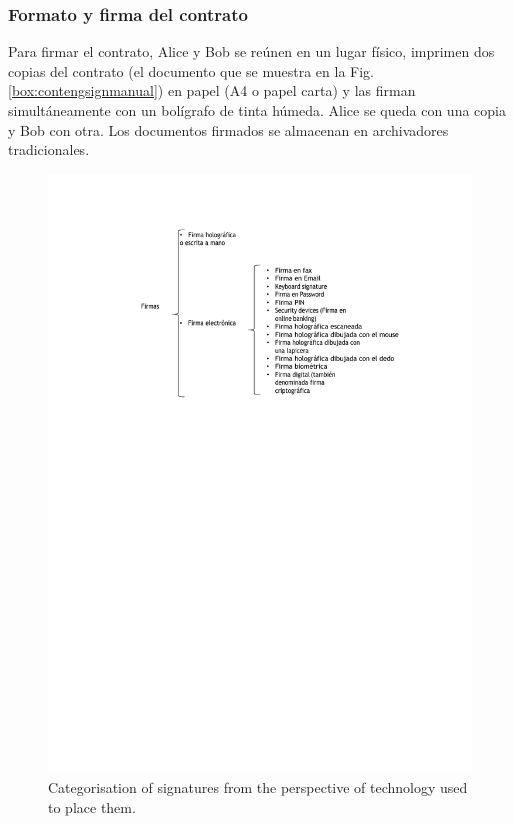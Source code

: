 \documentclass[12pt]{report} %
\begin{document}
\subsubsection{Formato y firma del contrato }

Para firmar el contrato, Alice y Bob se reúnen en un lugar físico, imprimen dos copias del contrato (el documento que se muestra en la Fig. \ref{box:contengsignmanual}) en papel (A4 o papel carta) y las firman simultáneamente con un bolígrafo de tinta húmeda. Alice se queda con una copia y Bob con otra. Los documentos firmados se almacenan en archivadores tradicionales.

\begin{figure}
\centering
\includegraphics[width=0.85\columnwidth]{imagenes/cuadrollavefirmas.pdf}
\caption{Categorisation of signatures from the perspective of technology used to place them.}
\label{vusftollsbrgitmsd.pdf}
\end{figure} 
\end{document}
